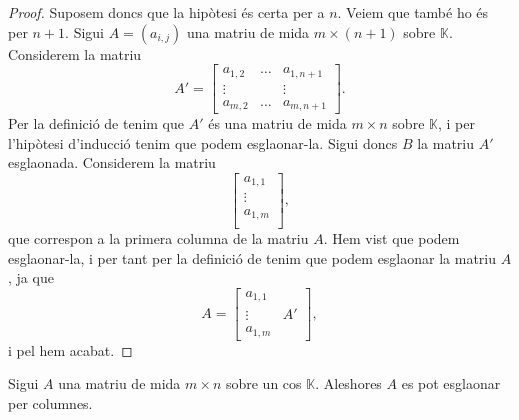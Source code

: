 \documentclass[../Apunts.tex]{subfiles}
\begin{document}
\begin{proposition}
\begin{proof}
			Suposem doncs que la hipòtesi és certa per a \(n\). Veiem que també ho és per \(n+1\). Sigui \(A=(a_{i,j})\) una matriu de mida \(m\times(n+1)\) sobre \(\mathbb{K}\). Considerem la matriu
			\[A'=\left[\begin{matrix}
			a_{1,2} & \dots & a_{1,n+1} \\
			\vdots & & \vdots \\
			a_{m,2} & \dots & a_{m,n+1}
			\end{matrix}\right].\]
			Per la definició de  tenim que \(A'\) és una matriu de mida \(m\times n\) sobre \(\mathbb{K}\), i per l'hipòtesi d'inducció tenim que podem esglaonar-la. Sigui doncs \(B\) la matriu \(A'\) esglaonada. Considerem la matriu
			\[\left[\begin{matrix}
			a_{1,1}\\
			\vdots\\
			a_{1,m}\\
			\end{matrix}\right],\]
			que correspon a la primera columna de la matriu \(A\). Hem vist que podem esglaonar-la, i per tant per la definició de  tenim que podem esglaonar la matriu \(A\), ja que
			\[A=\left[\begin{array}{c|c}
			a_{1,1} & \\
			\vdots & A' \\
			a_{1,m} & 
			\end{array}\right],\]
			i pel  hem acabat.
		\end{proof}
	\end{proposition}
	\begin{corollary}
		\label{corollary:es pot esglaonar qualsevol matriu per columnes}
		Sigui \(A\) una matriu de mida \(m\times n\) sobre un cos \(\mathbb{K}\). Aleshores \(A\) es pot esglaonar per columnes.
	\end{corollary}
\end{document}
